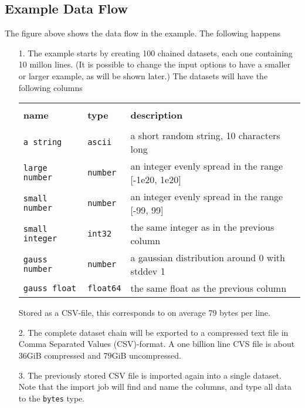 \documentclass[a4paper]{article}
\begin{document}
\subsection*{Example Data Flow}
The figure above shows the data flow in the example.  The following happens
\begin{enumerate}
\item[1.] The example starts by creating 100 chained datasets, each
  one containing 10 millon lines.  (It is possible to change the input
  options to have a smaller or larger example, as will be shown
  later.)  The datasets will have the following columns
  \begin{snugshade}
  \noindent\begin{tabular}{@{}p{3.0cm}p{2cm}p{8.5cm}}\hline\\[-1ex]
  \textbf{name} & \textbf{type} & \textbf{description}\\[1ex]
  \hline\\[-0.5ex]
  \texttt{a string}      & \texttt{ascii}   & a short random string, 10 characters long\\
  \texttt{large number}  & \texttt{number}  & an integer evenly spread in the range [-1e20, 1e20] \\
  \texttt{small number}  & \texttt{number}  & an integer evenly spread in the range [-99, 99]\\
  \texttt{small integer} & \texttt{int32}   & the same integer as in the previous column\\
  \texttt{gauss number}  & \texttt{number}  & a gaussian distribution around 0 with stddev 1\\
  \texttt{gauss float}   & \texttt{float64} & the same float as the previous column\\[1ex]
  \hline
  \end{tabular}
  \end{snugshade}
  Stored as a CSV-file, this corresponds to on average 79 bytes per
  line.
    
  \item[2.] The complete dataset chain will be exported to a
    compressed text file in Comma Separated Values (CSV)-format.  A
    one billion line CVS file is about 36GiB compressed and 79GiB
    uncompressed.


    
  \item[3.] The previously stored CSV file is imported again into a
    single dataset.  Note that the import job will find and name the
    columns, and type all data to the \texttt{bytes} type.


\end{enumerate}
\end{document}
